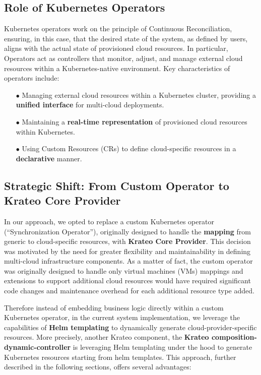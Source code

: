 \subsection{Role of Kubernetes Operators}

Kubernetes operators work on the principle of Continuous Reconciliation, ensuring, in this case, that the desired state of the system, as defined by users, aligns with the actual state of provisioned cloud resources. In particular, Operators act as controllers that monitor, adjust, and manage external cloud resources within a Kubernetes-native environment.
Key characteristics of operators include:
\begin{itemize}[itemsep=0.2pt, topsep=1pt]
  \item[$\bullet$] Managing external cloud resources within a Kubernetes cluster, providing a \textbf{unified interface} for multi-cloud deployments.
  \item[$\bullet$] Maintaining a \textbf{real-time representation} of provisioned cloud resources within Kubernetes.
  \item[$\bullet$] Using Custom Resources (CRs) to define cloud-specific resources in a \textbf{declarative} manner.
\end{itemize}

\subsection{Strategic Shift: From Custom Operator to Krateo Core Provider}

In our approach, we opted to replace a custom Kubernetes operator (``Synchronization Operator''), originally designed to handle the \textbf{mapping} from generic to cloud-specific resources, with \textbf{Krateo Core Provider}. This decision was motivated by the need for greater flexibility and maintainability in defining multi-cloud infrastructure components. As a matter of fact, the custom operator was originally designed to handle only virtual machines (VMs) mappings and extensions to support additional cloud resources would have required significant code changes and maintenance overhead for each additional resource type added.

Therefore instead of embedding business logic directly within a custom Kubernetes operator, in the current system implementation, we leverage the capabilities of \textbf{Helm templating} to dynamically generate cloud-provider-specific resources. More precisely, another Krateo component, the \textbf{Krateo composition-dynamic-controller} is leveraging Helm templating under the hood to generate Kubernetes resources starting from helm templates.
This approach, further described in the following sections, offers several advantages:


